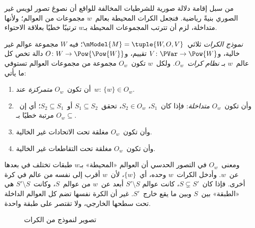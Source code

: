 \documentclass[../../../include/open-logic-section]{subfiles}
\begin{document}


من سبل إقامة دلالة صورية للشرطيات المخالفة للواقع أن نصوغ تصور لويس
غير الصوري بنيةً رياضية. فنجعل الكرات المحيطة بعالم~$w$ مجموعات من
العوالم؛ ولأنها متداخلة، لزم أن تترتب المجموعات المحيطة بـ$w$ ترتيبًا
خطيًا بعلاقة الاحتواء.

\begin{defn}
  \emph{نموذج الكرات} ثلاثي~$\mModel{M} = \tuple{W, O, V}$؛ فيه
  $W$ مجموعة عوالم غير خالية، و$V\colon \PVar \to \Pow{W}$ تقييم،
  و$O\colon W \to \Pow{\Pow{W}}$ دالة تخص كل عالم~$w$ بـ
  \emph{نظام كرات}~$O_w$. ولكل~$w$ تكون~$O_w$ مجموعة من مجموعات
  العوالم تستوفي ما يأتي:
  \begin{enumerate}
  \item أن تكون~$O_w$ \emph{متمركزة} عند~$w$: $\{w\} \in O_w$.
  \item وأن تكون~$O_w$ \emph{متداخلة}: فإذا كان~$S_1$، $S_2 \in O_w$،
    تحقق~$S_1 \subseteq S_2$ أو~$S_2 \subseteq S_1$؛ أي إن~$O_w$
    مرتبة خطيًا بـ$\subseteq$.
  \item وأن تكون~$O_w$ مغلقة تحت الاتحادات غير الخالية.
  \item وأن تكون~$O_w$ مغلقة تحت التقاطعات غير الخالية.
  \end{enumerate}
\end{defn}

ومعنى~$O_w$ في التصور الحدسي أن العوالم «المحيطة» بـ$w$ طبقات تختلف
في بعدها عن~$w$. وأدخل الكرات~$w$ وحده، أي~$\{w\}$، لأن~$w$ أقرب إلى
نفسه من عالم في كرة أخرى. فإذا كان~$S \subsetneq S'$، كانت عوالم
$S' \setminus S$ أبعد عن~$w$ من عوالم~$S$، وكانت~$S' \setminus S$
هي «الطبقة» بين~$S$ وبين ما يقع خارج~$S'$. غير أن الكرة نفسها تضم كل
العوالم الداخلة تحت سطحها الخارجي، ولا تقتصر على طبقة واحدة.

\begin{figure}
\begin{center}
\caption{تصوير لنموذج من الكرات}
\end{center}
\end{figure}
\end{document}
